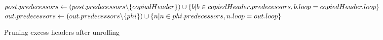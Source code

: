 \begin{algorithm}
    \begin{algorithmic}
                \State {}
            \EndFor
                \State $post.predecessors \gets (post.predecessors \backslash \{copiedHeader\}) \cup \newline \{b \vert  b \in copiedHeader.predecessors, b.loop = copiedHeader.loop\}$
            \EndFor
        \EndFunction
                    \State $out.predecessors \gets (out.predecessors \backslash \{phi\}) \cup \newline \{n \vert  n \in phi.predecessors, n.loop = out.loop\}$
                \EndIf
            \EndFor
        \EndFunction
    \end{algorithmic}
    \caption{Pruning excess headers after unrolling}
    \label{alg:impl:unroll:prune-headers}
\end{algorithm}